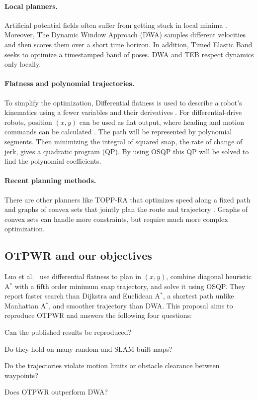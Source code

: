 \paragraph{Local planners.} Artificial potential fields often
\citep{khatib1986realtime} suffer from getting stuck in local minima \citep{koren1991potential}.
Moreover, The Dynamic Window Approach (DWA) \citep{fox1997dwa,yao2024improved} samples different velocities and then scores them over a short time horizon.
In addition, Timed Elastic Band \citep{rosmann2017integrated} seeks to optimize a timestamped band of poses. DWA and TEB respect dynamics only locally.

\paragraph{Flatness and polynomial trajectories.}
To simplify the optimization, Differential flatness is used to describe a robot's kinematics using a fewer variables
and their derivatives \citep{fliess1995flatness}. For differential-drive robots,
position $(x,y)$ can be used as flat output, where heading and motion commands can be calculated \citep{murray1995flat}. The path will be represented by polynomial segments. Then minimizing the integral of squared snap,
the rate of change of jerk, gives a quadratic program (QP). By using OSQP
\citep{stellato2020osqp} this QP will be solved to find the polynomial coefficients.

\paragraph{Recent planning methods.}
There are other planners like TOPP-RA that
optimizes speed along a fixed path \citep{pham2018toppra} and graphs of convex sets that jointly plan the
route and trajectory \citep{marcucci2023gcs}. Graphs of convex sets can
handle more constraints, but require much more complex optimization.
\subsection{OTPWR and our objectives}
\label{sec:otpwr}

Luo et al.\ \citep{luo2024otpwr} use differential flatness to plan in $(x,y)$, combine diagonal heuristic A$^\ast$ with a
fifth order minimum snap trajectory, and solve it using OSQP. They report faster search than Dijkstra and Euclidean A$^\ast$, a shortest path unlike Manhattan A$^\ast$, and smoother trajectory than DWA. This proposal aims to reproduce
OTPWR and answers the following four questions:

\begin{itemize*}[label={},itemjoin={\quad}]
    \item[(Q1)] Can the published results be reproduced?
    \item[(Q2)] Do they hold on many random and SLAM built maps?
    \item[(Q3)] Do the trajectories violate motion limits or obstacle clearance between waypoints?
    \item[(Q4)] Does OTPWR outperform DWA?
\end{itemize*}

